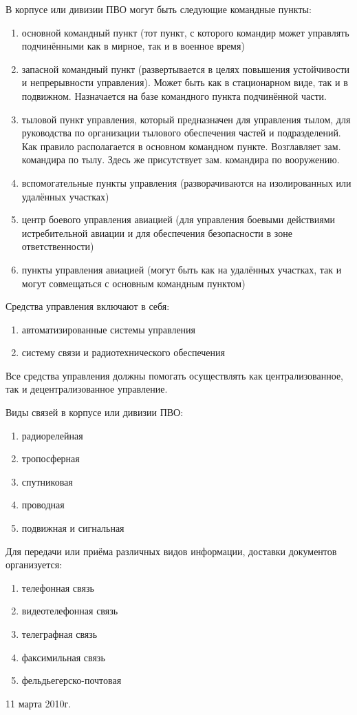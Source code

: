 \documentclass[a4paper,12pt]{article}
\begin{document}
	В корпусе или дивизии ПВО могут быть следующие командные пункты:
	\begin{enumerate}
		\item основной командный пункт (тот пункт, с которого командир может управлять 
		подчинёнными как в мирное, так и в военное время)
		\item запасной командный пункт (развертывается в целях повышения устойчивости и 
		непрерывности управления). Может быть как в стационарном виде, так и в подвижном. 
		Назначается на базе командного пункта подчинённой части. 
		\item тыловой пункт управления, который предназначен для управления тылом, для 
		руководства по организации тылового обеспечения частей и подразделений. Как правило 
		располагается в основном командном пункте. Возглавляет зам. командира по тылу. Здесь 
		же присутствует зам. командира по вооружению.
		\item вспомогательные пункты управления (разворачиваются на изолированных или удалённых
		участках)
		\item центр боевого управления авиацией (для управления боевыми действиями 
		истребительной авиации и для обеспечения безопасности в зоне ответственности)
		\item пункты управления авиацией (могут быть как на удалённых участках, так и могут 
		совмещаться с основным командным пунктом)
	\end{enumerate}
	Средства управления включают в себя:
	\begin{enumerate}
		\item автоматизированные системы управления
		\item систему связи и радиотехнического обеспечения
	\end{enumerate}
	Все средства управления должны помогать осуществлять как централизованное, так и
децентрализованное управление.

	Виды связей в корпусе или дивизии ПВО:
	\begin{enumerate}
		\item радиорелейная
		\item тропосферная
		\item спутниковая
		\item проводная
		\item подвижная и сигнальная
	\end{enumerate}
	Для передачи или приёма различных видов информации, доставки документов организуется:
	\begin{enumerate}
		\item телефонная связь
		\item видеотелефонная связь
		\item телеграфная связь
		\item факсимильная связь
		\item фельдьегерско-почтовая
	\end{enumerate}
	\newpage
	\centerline{11 марта 2010г.}
\end{document}
